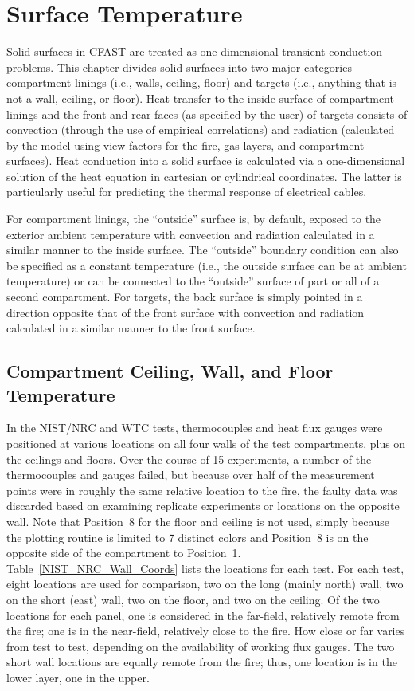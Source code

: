 \chapter{Surface Temperature}

Solid surfaces  in CFAST are treated as one-dimensional transient conduction problems. This chapter divides solid surfaces into two major categories -- compartment linings (i.e., walls, ceiling, floor) and targets (i.e., anything that is not a wall, ceiling, or floor). Heat transfer to the inside surface of compartment linings and the front and rear faces (as specified by the user) of targets consists of convection (through the use of empirical correlations) and radiation (calculated by the model using view factors for the fire, gas layers, and compartment surfaces). Heat conduction into a solid surface is calculated via a one-dimensional solution of the heat equation in cartesian or cylindrical coordinates.  The latter is particularly useful for predicting the thermal response of electrical cables.

For compartment linings, the ``outside'' surface is, by default, exposed to the exterior ambient temperature with convection and radiation calculated in a similar manner to the inside surface.  The ``outside'' boundary condition can also be specified as a constant temperature (i.e., the outside surface can be at ambient temperature) or can be connected to the ``outside'' surface of part or all of a second compartment.  For targets, the back surface is simply pointed in a direction opposite that of the front surface with convection and radiation calculated in a similar manner to the front surface.

\section{ Compartment Ceiling, Wall, and Floor Temperature}

In the NIST/NRC and WTC tests, thermocouples and heat flux gauges were positioned at various locations on all four walls of the test compartments, plus on the ceilings and floors. Over the course of 15 experiments, a number of the thermocouples and gauges failed, but because over half of the measurement points were in roughly the same relative location to the fire, the faulty data was discarded based on examining replicate experiments or locations on the opposite wall. Note that Position~8 for the floor and ceiling is not used, simply because the plotting routine is limited to 7 distinct colors and Position~8 is on the opposite side of the compartment to Position~1. Table~\ref{NIST_NRC_Wall_Coords} lists the locations for each test. For each test, eight locations are used for comparison, two on the long (mainly north) wall, two on the short (east) wall, two on the floor, and two on the ceiling.  Of the two locations for each panel, one is considered in the far-field, relatively remote from the fire; one is in the near-field, relatively close to the fire.  How close or far varies from test to test, depending on the availability of working flux gauges. The two short wall locations are equally remote from the fire; thus, one location is in the lower layer, one in the upper.


